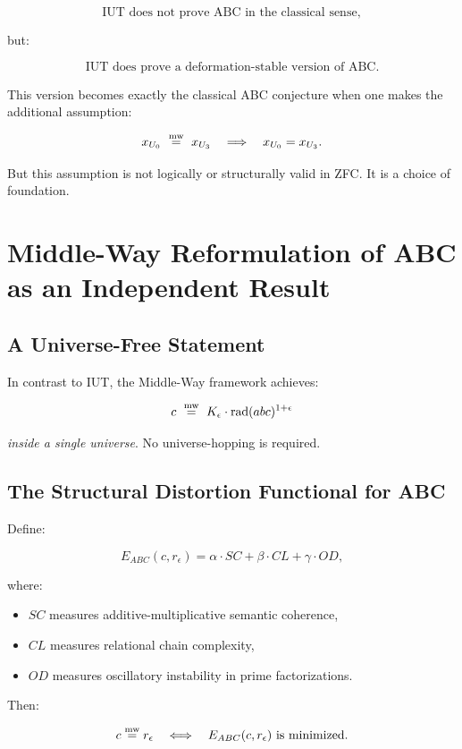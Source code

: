 \documentclass[11pt]{article}
\begin{document}
\[
\text{IUT does not prove ABC in the classical sense},
\]

but:

\[
\text{IUT does prove a deformation-stable version of ABC}.
\]

This version becomes exactly the classical ABC conjecture when one makes
the additional assumption:

\[
x_{U_0} \ \mathrel{\overset{\mathrm{mw}}{=}}\ x_{U_3} \quad \Longrightarrow \quad x_{U_0} = x_{U_3}.
\]

But this assumption is not logically or structurally valid in ZFC. It is
a choice of foundation.

\section{Middle-Way Reformulation of ABC as an Independent Result}

\subsection{A Universe-Free Statement}

In contrast to IUT, the Middle-Way framework achieves:

\[
c \ \mathrel{\overset{\mathrm{mw}}{=}} \ K_{\epsilon} \cdot \mathrm{rad}(abc)^{1+\epsilon}
\]

\emph{inside a single universe}.  
No universe-hopping is required.

\subsection{The Structural Distortion Functional for ABC}

Define:

\[
E_{ABC}(c, r_{\epsilon}) 
= \alpha \cdot SC + \beta \cdot CL + \gamma \cdot OD,
\]

where:

\begin{itemize}
\item $SC$ measures additive-multiplicative semantic coherence,
\item $CL$ measures relational chain complexity,
\item $OD$ measures oscillatory instability in prime factorizations.
\end{itemize}

Then:

\[
c \mathrel{\overset{\mathrm{mw}}{=}} r_{\epsilon}
\quad\Longleftrightarrow\quad 
E_{ABC}(c,r_{\epsilon}) \text{ is minimized}.
\]
\end{document}
